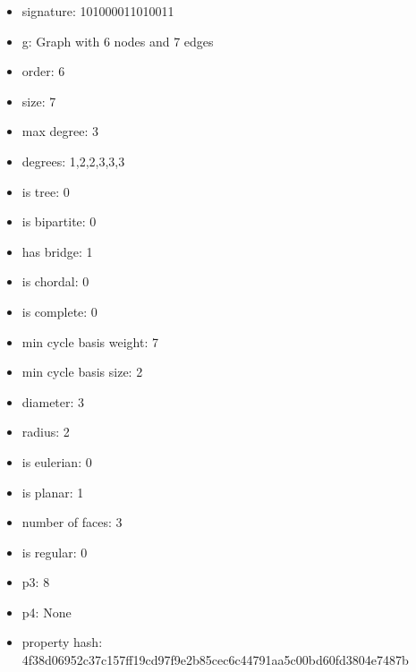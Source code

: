 \begin{itemize}
\item signature: 101000011010011
\item g: Graph with 6 nodes and 7 edges
\item order: 6
\item size: 7
\item max degree: 3
\item degrees: 1,2,2,3,3,3
\item is tree: 0
\item is bipartite: 0
\item has bridge: 1
\item is chordal: 0
\item is complete: 0
\item min cycle basis weight: 7
\item min cycle basis size: 2
\item diameter: 3
\item radius: 2
\item is eulerian: 0
\item is planar: 1
\item number of faces: 3
\item is regular: 0
\item p3: 8
\item p4: None
\item property hash: 4f38d06952c37c157ff19cd97f9e2b85cec6c44791aa5c00bd60fd3804e7487b
\end{itemize}
\newpage
\begin{figure}
\end{figure}
